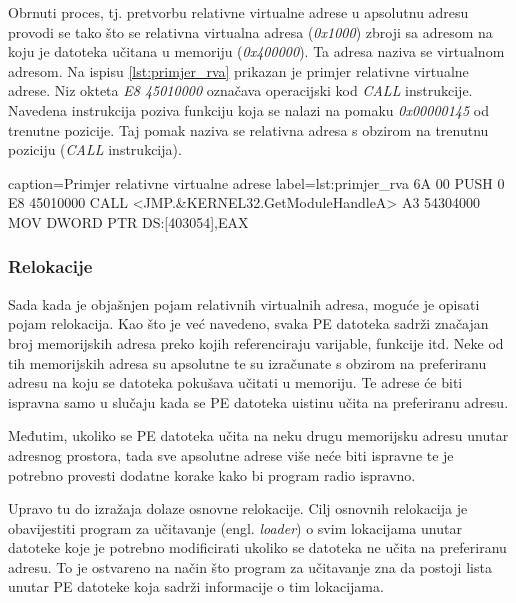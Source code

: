 \documentclass[times, utf8, diplomski, numeric]{fer}
\begin{document}
Obrnuti proces, tj. pretvorbu relativne virtualne adrese u
apsolutnu adresu provodi se tako što se relativna virtualna
adresa (\emph{0x1000}) zbroji sa adresom na koju je datoteka
učitana u memoriju (\emph{0x400000}). Ta adresa naziva se
virtualnom adresom. Na ispisu \ref{lst:primjer_rva}
prikazan je primjer relativne virtualne adrese. Niz okteta
\emph{E8 45010000} označava operacijski kod \emph{CALL}
instrukcije. Navedena instrukcija poziva funkciju koja se nalazi
na pomaku \emph{0x00000145} od trenutne pozicije. Taj pomak
naziva se relativna adresa s obzirom na trenutnu poziciju
(\emph{CALL} instrukcija). 

\begin{ispis} {caption=Primjer relativne virtualne adrese} {label=lst:primjer_rva}
6A 00	                      PUSH 0
E8 45010000                   CALL <JMP.&KERNEL32.GetModuleHandleA>
A3 54304000                   MOV DWORD PTR DS:[403054],EAX
\end{ispis}

\subsubsection{Relokacije}

Sada kada je objašnjen pojam relativnih virtualnih adresa, moguće
je opisati pojam relokacija. Kao što je već navedeno, svaka PE
datoteka sadrži značajan broj memorijskih adresa preko kojih
referenciraju varijable, funkcije itd. Neke od tih memorijskih adresa %
su apsolutne te su izračunate s obzirom na preferiranu
adresu na koju se datoteka pokušava učitati u memoriju. Te adrese
će biti ispravna samo u slučaju kada se PE datoteka uistinu učita
na preferiranu adresu.

Međutim, ukoliko se PE datoteka učita na neku drugu memorijsku
adresu unutar adresnog prostora, tada sve apsolutne adrese više
neće biti ispravne te je potrebno provesti dodatne korake kako bi
program radio ispravno. 

Upravo tu do izražaja dolaze osnovne relokacije. Cilj osnovnih
relokacija je obavijestiti program za učitavanje 
(engl. \emph{loader}) o svim lokacijama unutar datoteke koje je
potrebno modificirati ukoliko se datoteka ne učita na preferiranu
adresu. To je ostvareno na način što program za učitavanje zna da
postoji lista unutar PE datoteke koja sadrži informacije o tim
lokacijama.
\end{document}
